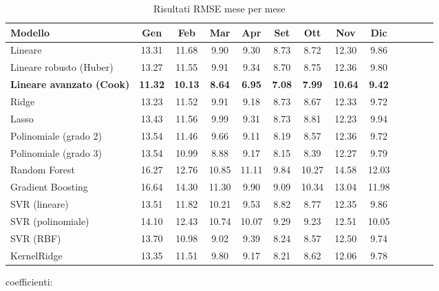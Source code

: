 \begin{table}[H]
    \footnotesize
    \centering
    \def\arraystretch{0.9}
    \setlength{\tabcolsep}{5pt}
    \begin{tabular}{|l|c|c|c|c|c|c|c|c|c|c|c|c|}
    \hline
        \textbf{Modello} & \textbf{Gen} & \textbf{Feb} & \textbf{Mar} & \textbf{Apr} & \textbf{Set} & \textbf{Ott} & \textbf{Nov} & \textbf{Dic} \\ \hline
        Lineare & 13.31 & 11.68 & 9.90 & 9.30 & 8.73 & 8.72 & 12.30 & 9.86 \\ \hline
        Lineare robusto (Huber) & 13.27 & 11.55 & 9.91 & 9.34 & 8.70 & 8.75 & 12.36 & 9.80 \\ \hline
        \textbf{Lineare avanzato (Cook)} & \textbf{11.32} & \textbf{10.13} & \textbf{8.64} & \textbf{6.95} & \textbf{7.08} & \textbf{7.99} & \textbf{10.64} & \textbf{9.42} \\ \hline
        Ridge & 13.23 & 11.52 & 9.91 & 9.18 & 8.73 & 8.67 & 12.33 & 9.72 \\ \hline
        Lasso & 13.43 & 11.56 & 9.99 & 9.31 & 8.73 & 8.81 & 12.23 & 9.94 \\ \hline
        Polinomiale (grado 2) & 13.54 & 11.46 & 9.66 & 9.11 & 8.19 & 8.57 & 12.36 & 9.72 \\ \hline
        Polinomiale (grado 3) & 13.54 & 10.99 & 8.88 & 9.17 & 8.15 & 8.39 & 12.27 & 9.79 \\ \hline
        Random Forest & 16.27 & 12.76 & 10.85 & 11.11 & 9.84 & 10.27 & 14.58 & 12.03 \\ \hline
        Gradient Boosting & 16.64 & 14.30 & 11.30 & 9.90 & 9.09 & 10.34 & 13.04 & 11.98 \\ \hline
        SVR (lineare) & 13.51 & 11.82 & 10.21 & 9.53 & 8.82 & 8.77 & 12.35 & 9.86 \\ \hline
        SVR (polinomiale) & 14.10 & 12.43 & 10.74 & 10.07 & 9.29 & 9.23 & 12.51 & 10.05 \\ \hline
        SVR (RBF) & 13.70 & 10.98 & 9.02 & 9.39 & 8.24 & 8.57 & 12.50 & 9.74 \\ \hline
        KernelRidge & 13.35 & 11.51 & 9.80 & 9.17 & 8.21 & 8.62 & 12.06 & 9.78 \\ \hline
    \end{tabular}
    \caption{Risultati RMSE mese per mese}
    \label{fig:risultati-no2-rmse-mese}
\end{table}


coefficienti:


